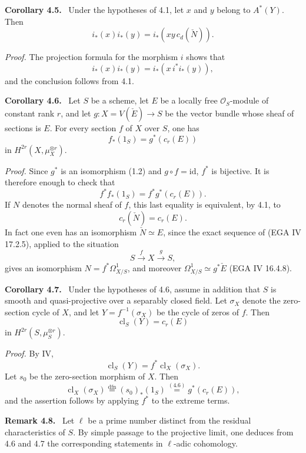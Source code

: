 \documentclass[11pt]{article}
\newenvironment{statement}[1]{\par\medskip\noindent\textbf{#1.}\ }{\par\medskip}
\providecommand{\cl}{\operatorname{cl}}
\providecommand{\cl}{\operatorname{cl}}
\providecommand{\cl}{\operatorname{cl}}
\begin{document}
\begin{statement}{Corollary 4.5}
Under the hypotheses of 4.1, let $x$ and $y$ belong to $A^*(Y)$. Then
\[
i_*(x)i_*(y)=i_*(xy\,c_d(\check N)).
\]
\end{statement}

\emph{Proof.} The projection formula for the morphism $i$ shows that
\[
i_*(x)i_*(y)=i_*(x\,i^*i_*(y)),
\]
and the conclusion follows from 4.1.

\begin{statement}{Corollary 4.6}
Let $S$ be a scheme, let $E$ be a locally free $\mathcal O_S$-module of constant rank $r$, and let $g:X=V(\check E)\to S$ be the vector bundle whose sheaf of sections is $E$. For every section $f$ of $X$ over $S$, one has
\[
f_*(1_S)=g^*(c_r(E))
\]
in $H^{2r}(X,\mu_X^{\otimes r})$.
\end{statement}

\emph{Proof.} Since $g^*$ is an isomorphism (1.2) and $g\circ f=\mathrm{id}$, $f^*$ is bijective. It is therefore enough to check that
\[
f^*f_*(1_S)=f^*g^*(c_r(E)).
\]
If $N$ denotes the normal sheaf of $f$, this last equality is equivalent, by 4.1, to
\[
c_r(\check N)=c_r(E).
\]
In fact one even has an isomorphism $\check N\simeq E$, since the exact sequence of (EGA IV 17.2.5), applied to the situation
\[
S\xrightarrow{f} X\xrightarrow{g} S,
\]
gives an isomorphism $N=f^*\Omega^1_{X/S}$, and moreover $\Omega^1_{X/S}\simeq g^*\check E$ (EGA IV 16.4.8).

\begin{statement}{Corollary 4.7}
Under the hypotheses of 4.6, assume in addition that $S$ is smooth and quasi-projective over a separably closed field. Let $\sigma_X$ denote the zero-section cycle of $X$, and let $Y=f^{-1}(\sigma_X)$ be the cycle of zeros of $f$. Then
\[
\cl_S(Y)=c_r(E)
\]
in $H^{2r}(S,\mu_S^{\otimes r})$.
\end{statement}

\emph{Proof.} By IV,
\[
\cl_S(Y)=f^*\cl_X(\sigma_X).
\]
Let $s_0$ be the zero-section morphism of $X$. Then
\[
\cl_X(\sigma_X)\stackrel{\mathrm{dfn}}{=}(s_0)_*(1_S)\stackrel{(4.6)}{=}g^*(c_r(E)),
\]
and the assertion follows by applying $f^*$ to the extreme terms.

\begin{statement}{Remark 4.8}
Let $\ell$ be a prime number distinct from the residual characteristics of $S$. By simple passage to the projective limit, one deduces from 4.6 and 4.7 the corresponding statements in $\ell$-adic cohomology.
\end{statement}
\end{document}
